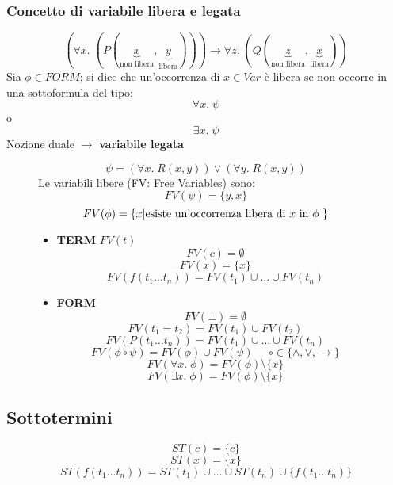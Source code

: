 \documentclass{article}
\theoremstyle{break}
\theoremstyle{break}
\theoremstyle{break}
\theoremstyle{break}
\begin{document}
\subsubsection{Concetto di variabile libera e legata}
\[
  (\forall x.\; (P(\underbrace{x}_{\text{non libera}},\underbrace{y}_{\text{libera}}))) \to \forall z.\; (Q(\underbrace{z}_{\text{non libera}},\underbrace{x}_{\text{libera}}))
\] 
Sia \( \phi \in FORM \); si dice che un'occorrenza di \( x \in Var \) è libera se non occorre
in una sottoformula del tipo:
\[ \forall x.\; \psi \] o \[ \exists x.\; \psi \] 
Nozione duale \( \to  \) \textbf{variabile legata}
\begin{figure}[H]
  \begin{example}
    \[
    \psi = (\forall x.\; R(x,y)) \vee (\forall y.\; R(x,y))
    \] 
    Le variabili libere (FV: Free Variables) sono:
    \[
    FV(\psi) = \{y,x\}
    \] 
    \[
    FV(\phi) = \{x | \text{esiste un'occorrenza libera di \( x \) in \( \phi \) }\} 
    \] 
  \end{example}
\end{figure}

\begin{figure}[H]
  \begin{definition}
    \begin{itemize}
      \item \textbf{TERM} \( FV(t) \) 
        \[
        FV(c) = \emptyset
        \] 
        \[
        FV(x) = \{x\} 
        \] 
        \[
        FV(f(t_1 \ldots t_n)) = FV(t_1) \cup \ldots \cup FV(t_n)
        \] 
      \item \textbf{FORM}
        \[
        FV(\bot) = \emptyset
        \] 
        \[
        FV(t_1 = t_2) = FV(t_1) \cup FV(t_2)
        \] 
        \[
        FV(P(t_1 \ldots t_n)) = FV(t_1) \cup \ldots \cup FV(t_n)
        \] 
        \[
        FV(\phi \circ \psi) = FV(\phi) \cup FV(\psi) \;\;\;\;\; \circ \in \{\wedge, \vee, \to \}
        \] 
        \[
        FV(\forall x.\; \phi) = FV(\phi) \setminus \{x\}
        \] 
        \[
        FV(\exists x.\; \phi) = FV(\phi) \setminus \{x\}
        \] 
    \end{itemize} 
  \end{definition}
\end{figure}

\subsection{Sottotermini}
\[
  ST(\overline{c}) = \{\overline{c}\} 
\] 
\[
  ST(x) = \{x\} 
\] 
\[
  ST(f(t_1 \ldots t_n)) = ST(t_1) \cup \ldots \cup ST(t_n) \cup \{f(t_1 \ldots t_n)\} 
\] 
\end{document}
